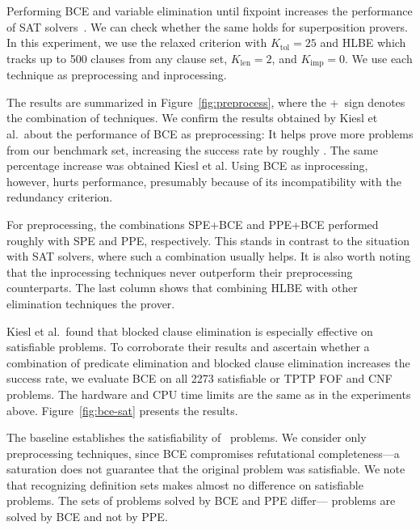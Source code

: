 Performing BCE and variable elimination until fixpoint increases the performance
of SAT solvers~\cite{jbh-10-BCE}. We can check whether the same holds for superposition provers.
In this experiment, we use the relaxed criterion with
$K_\mathrm{tol}=25$ and HLBE which tracks up
to 500 clauses from any clause set, $K_\mathrm{len}=2$, and
$K_{\mathrm{imp}}=0$. We use each technique as preprocessing and inprocessing.

The results are summarized in Figure~\ref{fig:preprocess}, where
the +~sign denotes the combination of techniques.
We confirm the results obtained by Kiesl et al.\ about the performance of BCE
as preprocessing:
It helps prove  more problems from our benchmark set, increasing the
success rate by roughly . The same percentage increase was obtained Kiesl et al.
%
Using BCE as inprocessing, however, hurts performance, presumably because of
its incompatibility with the redundancy criterion.

%
For preprocessing, the combinations SPE+BCE and PPE+BCE performed roughly  with SPE and PPE, respectively. This stands in contrast to the situation
with SAT solvers, where such a combination usually helps. It is also worth noting
that the inprocessing techniques never outperform their preprocessing
counterparts.
%
The last column shows that combining HLBE with other elimination techniques
 the prover.


%
%
Kiesl et al.\ found that blocked clause elimination is especially effective on
satisfiable problems. To corroborate their results and ascertain
whether a combination of predicate elimination and blocked clause elimination
increases the success rate, we evaluate BCE on all 2273
satisfiable or TPTP FOF and CNF problems.
The hardware and CPU time limits are the same as in the experiments above.
Figure~\ref{fig:bce-sat} presents the results.

The baseline establishes the satisfiability of \baseres~problems. We consider
only preprocessing techniques, since BCE compromises refutational
completeness---a saturation does not guarantee that the original problem was
satisfiable. We note that recognizing definition sets makes almost no difference on
satisfiable problems. The sets of problems solved by BCE and PPE
differ--- problems are solved by BCE and not by PPE.

